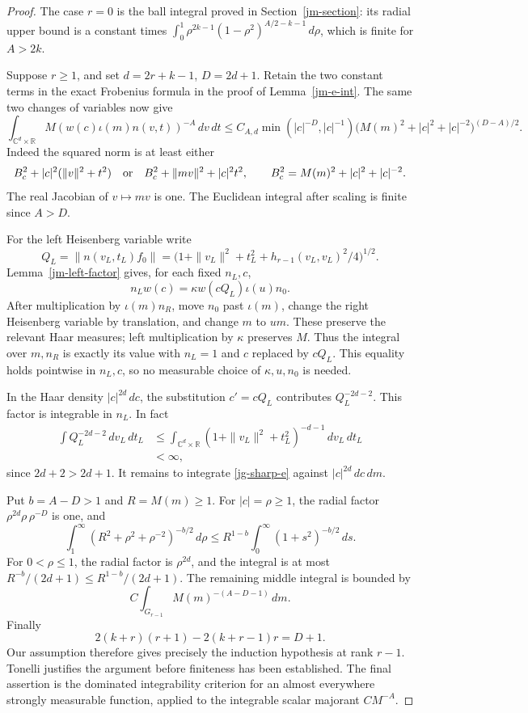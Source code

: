 \begin{proof}
The case \(r=0\) is the ball integral proved in
Section~\ref{jm-section}: its radial upper bound is a constant
times
\(\int_0^1 \rho^{2k-1}(1-\rho^2)^{A/2-k-1}\,d\rho\),
which is finite for \(A>2k\).

Suppose \(r\geq1\), and set \(d=2r+k-1\), \(D=2d+1\).
Retain the two constant terms in the exact Frobenius formula
in the proof of Lemma~\ref{jm-e-int}.  The same two changes
of variables now give
\begin{equation}\label{jg-sharp-e}
 \int_{\mathbb C^d\times\mathbb R}
    M(w(c)\iota(m)n(v,t))^{-A}\,dv\,dt
 \leq C_{A,d}\min(|c|^{-D},|c|^{-1})
       \bigl(M(m)^2+|c|^2+|c|^{-2}\bigr)^{(D-A)/2}.
\end{equation}
Indeed the squared norm is at least either
\[
 B_c^2+|c|^2(\|v\|^2+t^2)
 \quad\hbox{or}\quad B_c^2+\|mv\|^2+|c|^2t^2,
 \qquad B_c^2=M(m)^2+|c|^2+|c|^{-2}.
\]
The real Jacobian of \(v\mapsto mv\) is one.
The Euclidean integral after scaling is finite since \(A>D\).

For the left Heisenberg variable write
\[
 Q_L=\|n(v_L,t_L)f_0\|
  =\bigl(1+\|v_L\|^2+t_L^2+
                       h_{r-1}(v_L,v_L)^2/4\bigr)^{1/2}.
\]
Lemma~\ref{jm-left-factor} gives, for each fixed \(n_L,c\),
\[
             n_Lw(c)=\kappa w(cQ_L)\iota(u)n_0.
\]
After multiplication by \(\iota(m)n_R\), move \(n_0\)
past \(\iota(m)\), change the right Heisenberg variable
by translation, and change \(m\) to \(um\).
These preserve the relevant Haar measures; left multiplication
by \(\kappa\) preserves \(M\).
Thus the integral over \(m,n_R\) is exactly its value with
\(n_L=1\) and \(c\) replaced by \(cQ_L\).
This equality holds pointwise in \(n_L,c\), so no measurable
choice of \(\kappa,u,n_0\) is needed.

In the Haar density \(|c|^{2d}\,dc\), the substitution
\(c'=cQ_L\) contributes \(Q_L^{-2d-2}\).
This factor is integrable in \(n_L\).  In fact
\[
 \begin{split}
 \int Q_L^{-2d-2}\,dv_L\,dt_L
 &\leq \int_{\mathbb C^d\times\mathbb R}
                   (1+\|v_L\|^2+t_L^2)^{-d-1}\,dv_L\,dt_L\\
 &<\infty ,
 \end{split}
\]
since \(2d+2>2d+1\).
It remains to integrate \eqref{jg-sharp-e} against
\(|c|^{2d}\,dc\,dm\).

Put \(b=A-D>1\) and \(R=M(m)\geq1\).
For \(|c|=\rho\geq1\), the radial factor
\(\rho^{2d}\rho\,\rho^{-D}\) is one, and
\[
 \int_1^\infty(R^2+\rho^2+\rho^{-2})^{-b/2}\,d\rho
 \leq R^{1-b}\int_0^\infty(1+s^2)^{-b/2}\,ds.
\]
For \(0<\rho\leq1\), the radial factor is \(\rho^{2d}\), and
the integral is at most \(R^{-b}/(2d+1)\leq R^{1-b}/(2d+1)\).
The remaining middle integral is bounded by
\[
              C\int_{G_{r-1}}M(m)^{-(A-D-1)}\,dm.
\]
Finally
\[
 2(k+r)(r+1)-2(k+r-1)r=D+1.
\]
Our assumption therefore gives precisely the induction
hypothesis at rank \(r-1\).  Tonelli justifies the argument
before finiteness has been established.
The final assertion is the dominated integrability criterion
for an almost everywhere strongly measurable function,
applied to the integrable scalar majorant \(C M^{-A}\).
\end{proof}

